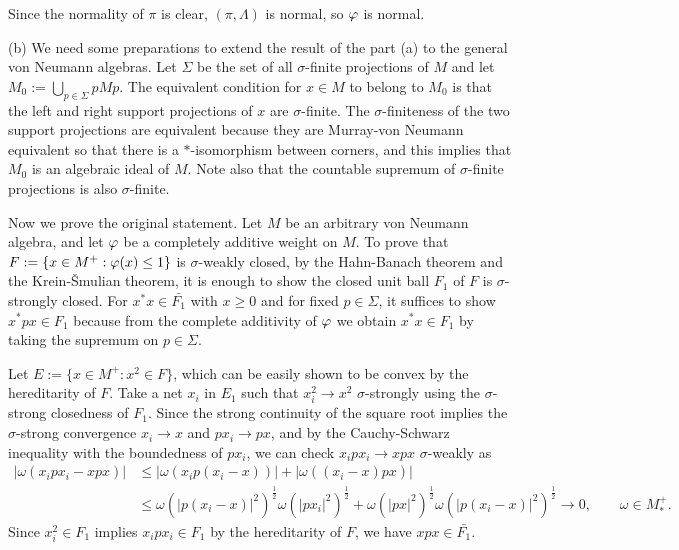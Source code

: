 \documentclass{../../large}
\begin{document}
\begin{pf}
Since the normality of $\pi$ is clear, $(\pi,\Lambda)$ is normal, so $\varphi$ is normal.


(b)
We need some preparations to extend the result of the part (a) to the general von Neumann algebras.
Let $\Sigma$ be the set of all $\sigma$-finite projections of $M$ and let $M_0:=\bigcup_{p\in\Sigma}pMp$.
The equivalent condition for $x\in M$ to belong to $M_0$ is that the left and right support projections of $x$ are $\sigma$-finite.
The $\sigma$-finiteness of the two support projections are equivalent because they are Murray-von Neumann equivalent so that there is a $*$-isomorphism between corners, and this implies that $M_0$ is an algebraic ideal of $M$.
Note also that the countable supremum of $\sigma$-finite projections is also $\sigma$-finite.



Now we prove the original statement.
Let $M$ be an arbitrary von Neumann algebra, and let $\varphi$ be a completely additive weight on $M$.
To prove that $F:=\{x\in M^+:\varphi(x)\le1\}$ is $\sigma$-weakly closed, by the Hahn-Banach theorem and the Krein-\v Smulian theorem, it is enough to show the closed unit ball $F_1$ of $F$ is $\sigma$-strongly closed.
For $x^*x\in\bar{F_1}$ with $x\ge0$ and for fixed $p\in\Sigma$, it suffices to show $x^*px\in F_1$ because from the complete additivity of $\varphi$ we obtain $x^*x\in F_1$ by taking the supremum on $p\in\Sigma$.

Let $E:=\{x\in M^+:x^2\in F\}$, which can be easily shown to be convex by the hereditarity of $F$.
Take a net $x_i$ in $E_1$ such that $x_i^2\to x^2$ $\sigma$-strongly using the $\sigma$-strong closedness of $F_1$.
Since the strong continuity of the square root implies the $\sigma$-strong convergence $x_i\to x$ and $px_i\to px$, and by the Cauchy-Schwarz inequality with the boundedness of $px_i$, we can check $x_ipx_i\to xpx$ $\sigma$-weakly as
\begin{align*}
|\omega(x_ipx_i-xpx)|
&\le|\omega(x_ip(x_i-x))|+|\omega((x_i-x)px)|\\
&\le\omega(|p(x_i-x)|^2)^{\frac12}\omega(|px_i|^2)^{\frac12}+\omega(|px|^2)^{\frac12}\omega(|p(x_i-x)|^2)^{\frac12}\to0,\qquad\omega\in M_*^+.
\end{align*}
Since $x_i^2\in F_1$ implies $x_ipx_i\in F_1$ by the hereditarity of $F$, we have $xpx\in\bar{F_1}$.



\end{pf}
\end{document}
